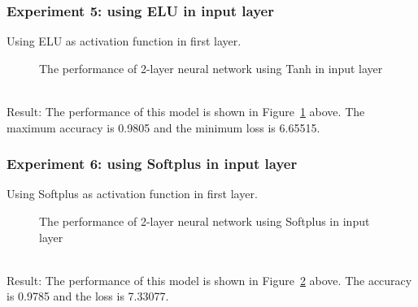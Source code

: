\documentclass[]{UCD_CS_FYP_Report}
\begin{document}
\subsubsection{Experiment 5: using ELU in input layer}
Using ELU as activation function in first layer.
\begin{figure}[h]
\centering
\fboxsep 2mm
\caption{\label{fig:MNIST_fully_connected_S2E5} The performance of 2-layer neural network using Tanh in input layer}
\end{figure}
\\Result: The performance of this model is shown in Figure~\ref{fig:MNIST_fully_connected_S2E5} above. The maximum accuracy is 0.9805 and the minimum loss is 6.65515.
%
\subsubsection{Experiment 6: using Softplus in input layer}
Using Softplus as activation function in first layer.
\begin{figure}[h]
\centering
\fboxsep 2mm
\caption{\label{fig:MNIST_fully_connected_S2E6} The performance of 2-layer neural network using Softplus in input layer}
\end{figure}
\\Result: The performance of this model is shown in Figure~\ref{fig:MNIST_fully_connected_S2E6} above. The accuracy is 0.9785 and the loss is 7.33077.
%
\end{document}
